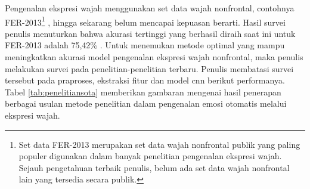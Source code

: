 Pengenalan ekspresi wajah menggunakan set data wajah nonfrontal, contohnya FER-2013\footnote{Set data FER-2013 merupakan set data wajah nonfrontal publik yang paling populer digunakan dalam banyak penelitian pengenalan ekspresi wajah. Sejauh pengetahuan terbaik penulis, belum ada set data wajah nonfrontal lain yang tersedia secara publik.} , hingga sekarang belum mencapai kepuasan berarti. Hasil survei penulis menuturkan bahwa akurasi tertinggi yang berhasil diraih saat ini untuk FER-2013 adalah 75,42\% . Untuk menemukan metode optimal yang mampu meningkatkan akurasi model pengenalan ekspresi wajah nonfrontal, maka penulis melakukan survei pada penelitian-penelitian terbaru. Penulis membatasi survei tersebut pada praproses, ekstraksi fitur dan model \acrshort{cnn} berikut performanya. Tabel \ref{tab:penelitiansota} memberikan gambaran mengenai hasil penerapan berbagai usulan metode penelitian dalam pengenalan emosi otomatis melalui ekspresi wajah.
